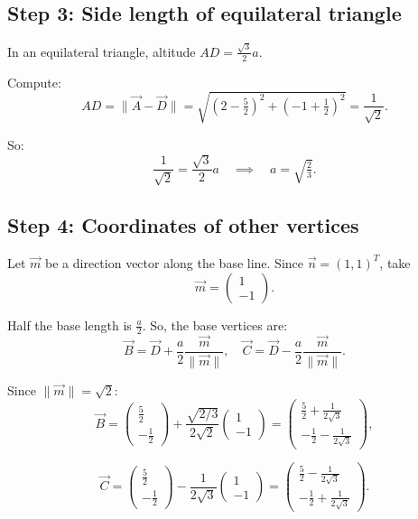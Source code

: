 \documentclass[journal]{IEEEtran}
\begin{document}
\subsection*{\textbf{Step 3: Side length of equilateral triangle}}

In an equilateral triangle, altitude $AD = \tfrac{\sqrt{3}}{2}a$.  

Compute:
\[
AD = \|\vec{A}-\vec{D}\| = \sqrt{\left(2-\tfrac{5}{2}\right)^2 + \left(-1+\tfrac{1}{2}\right)^2} 
= \frac{1}{\sqrt{2}}.
\]

So:
\[
\frac{1}{\sqrt{2}} = \frac{\sqrt{3}}{2}a \quad \implies \quad a = \sqrt{\tfrac{2}{3}}.
\]

\subsection*{\textbf{Step 4: Coordinates of other vertices}}

Let $\vec{m}$ be a direction vector along the base line. Since $\vec{n}=(1,1)^T$, take
\[
\vec{m} = \begin{pmatrix}1 \\ -1\end{pmatrix}.
\]

Half the base length is $\tfrac{a}{2}$.  
So, the base vertices are:
\[
\vec{B} = \vec{D} + \frac{a}{2}\frac{\vec{m}}{\|\vec{m}\|}, \quad 
\vec{C} = \vec{D} - \frac{a}{2}\frac{\vec{m}}{\|\vec{m}\|}.
\]

Since $\|\vec{m}\| = \sqrt{2}$:
\[
\vec{B} = \begin{pmatrix}\tfrac{5}{2}\\ -\tfrac{1}{2}\end{pmatrix} + 
\frac{\sqrt{2/3}}{2\sqrt{2}}\begin{pmatrix}1\\-1\end{pmatrix}
= \begin{pmatrix}\tfrac{5}{2}+\tfrac{1}{2\sqrt{3}}\\ -\tfrac{1}{2}-\tfrac{1}{2\sqrt{3}}\end{pmatrix},
\]

\[
\vec{C} = \begin{pmatrix}\tfrac{5}{2}\\ -\tfrac{1}{2}\end{pmatrix} - 
\frac{1}{2\sqrt{3}}\begin{pmatrix}1\\-1\end{pmatrix}
= \begin{pmatrix}\tfrac{5}{2}-\tfrac{1}{2\sqrt{3}}\\ -\tfrac{1}{2}+\tfrac{1}{2\sqrt{3}}\end{pmatrix}.
\]
\end{document}
